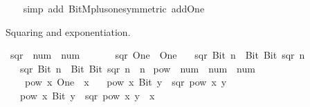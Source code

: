 \begin{isabellebody}
%
\isadelimproof
\ \ %
\endisadelimproof
%
\isatagproof
{}\isamarkupfalse%
\ {\isacharparenleft}{\kern0pt}simp\ add{\isacharcolon}{\kern0pt}\ BitM{\isacharunderscore}{\kern0pt}plus{\isacharunderscore}{\kern0pt}one{\isacharbrackleft}{\kern0pt}symmetric{\isacharbrackright}{\kern0pt}\ add{\isacharunderscore}{\kern0pt}One{\isacharparenright}{\kern0pt}%
\endisatagproof
{\isafoldproof}%
%
\isadelimproof
%
\endisadelimproof
%
\begin{isamarkuptext}%
Squaring and exponentiation.%
\end{isamarkuptext}\isamarkuptrue%
\isamarkupfalse%
\ sqr\ {\isacharcolon}{\kern0pt}{\isacharcolon}{\kern0pt}\ {\isachardoublequoteopen}num\ {\isasymRightarrow}\ num{\isachardoublequoteclose}\isanewline
\ \ \isanewline
\ \ \ \ {\isachardoublequoteopen}sqr\ One\ {\isacharequal}{\kern0pt}\ One{\isachardoublequoteclose}\isanewline
\ \ {\isacharbar}{\kern0pt}\ {\isachardoublequoteopen}sqr\ {\isacharparenleft}{\kern0pt}Bit{}\ n{\isacharparenright}{\kern0pt}\ {\isacharequal}{\kern0pt}\ Bit{}\ {\isacharparenleft}{\kern0pt}Bit{}\ {\isacharparenleft}{\kern0pt}sqr\ n{\isacharparenright}{\kern0pt}{\isacharparenright}{\kern0pt}{\isachardoublequoteclose}\isanewline
\ \ {\isacharbar}{\kern0pt}\ {\isachardoublequoteopen}sqr\ {\isacharparenleft}{\kern0pt}Bit{}\ n{\isacharparenright}{\kern0pt}\ {\isacharequal}{\kern0pt}\ Bit{}\ {\isacharparenleft}{\kern0pt}Bit{}\ {\isacharparenleft}{\kern0pt}sqr\ n\ {\isacharplus}{\kern0pt}\ n{\isacharparenright}{\kern0pt}{\isacharparenright}{\kern0pt}{\isachardoublequoteclose}\isanewline
\isanewline
{}\isamarkupfalse%
\ pow\ {\isacharcolon}{\kern0pt}{\isacharcolon}{\kern0pt}\ {\isachardoublequoteopen}num\ {\isasymRightarrow}\ num\ {\isasymRightarrow}\ num{\isachardoublequoteclose}\isanewline
\ \ \isanewline
\ \ \ \ {\isachardoublequoteopen}pow\ x\ One\ {\isacharequal}{\kern0pt}\ x{\isachardoublequoteclose}\isanewline
\ \ {\isacharbar}{\kern0pt}\ {\isachardoublequoteopen}pow\ x\ {\isacharparenleft}{\kern0pt}Bit{}\ y{\isacharparenright}{\kern0pt}\ {\isacharequal}{\kern0pt}\ sqr\ {\isacharparenleft}{\kern0pt}pow\ x\ y{\isacharparenright}{\kern0pt}{\isachardoublequoteclose}\isanewline
\ \ {\isacharbar}{\kern0pt}\ {\isachardoublequoteopen}pow\ x\ {\isacharparenleft}{\kern0pt}Bit{}\ y{\isacharparenright}{\kern0pt}\ {\isacharequal}{\kern0pt}\ sqr\ {\isacharparenleft}{\kern0pt}pow\ x\ y{\isacharparenright}{\kern0pt}\ {\isacharasterisk}{\kern0pt}\ x{\isachardoublequoteclose}\isanewline

\end{isabellebody}
